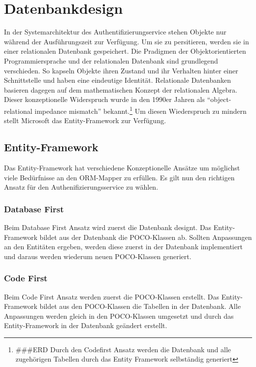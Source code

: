 \newpage

\section{Datenbankdesign}\label{datenbankdesign}

In der Systemarchitektur des Authentifizierungservice stehen Objekte nur
während der Ausführungszeit zur Verfügung. Um sie zu persitieren, werden
sie in einer relationalen Datenbank gespeichert. Die Pradigmen der
Objektorientierten Programmiersprache und der relationalen Datenbank
sind grundlegend verschieden. So kapseln Objekte ihren Zustand und ihr
Verhalten hinter einer Schnittstelle und haben eine eindeutige
Identität. Relationale Datenbanken basieren dagegen auf dem
mathematischen Konzept der relationalen Algebra. Dieser konzeptionelle
Widerspruch wurde in den 1990er Jahren als ``object-relational impedance
mismatch'' bekannt.\footnote{\autocite{the-vietnam-of-computer-science}
  \#\#\#ERD Durch den Codefirst Ansatz werden die Datenbank und alle
  zugehörigen Tabellen durch das Entity Framework selbständig generiert}
Um diesen Wiederspruch zu mindern stellt Microsoft das Entity-Framework
zur Verfügung.

\subsection{Entity-Framework}\label{entity-framework}

Das Entity-Framework hat verschiedene Konzeptionelle Ansätze um
möglichst viele Bedürfnisse an den ORM-Mapper zu erfüllen. Es gilt nun
den richtigen Ansatz für den Authenifizierungsservice zu wählen.

\subsubsection{Database First}\label{database-first}

Beim Database First Ansatz wird zuerst die Datenbank designt. Das
Entity-Framework bildet aus der Datenbank die POCO-Klassen ab. Sollten
Anpassungen an den Entitäten ergeben, werden diese zuerst in der
Datenbank implementiert und daraus werden wiederum neuen POCO-Klassen
generiert.

\subsubsection{Code First}\label{code-first}

Beim Code First Ansatz werden zuerst die POCO-Klassen erstellt. Das
Entity-Framework bildet aus den POCO-Klassen die Tabellen in der
Datenbank. Alle Anpassungen werden gleich in den POCO-Klassen umgesetzt
und durch das Entity-Framework in der Datenbank geändert erstellt.

